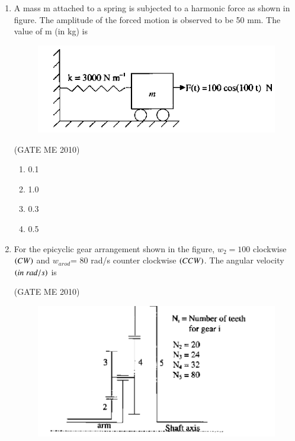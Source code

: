 \documentclass[journal,12pt,onecolumn]{IEEEtran}
\theoremstyle{remark}
\begin{document}
\begin{enumerate}
Direct shear stress $\brak{in\;MPa}$ in the most heavily loaded rivet is 


  \hfill{(GATE ME 2010)}

\begin{multicols}{4}
\begin{enumerate}
\item 4.4
\item 8.8
\item 17.6
\item 35.2
\end{enumerate}
\end{multicols}



\item A mass m attached to a spring is subjected to a harmonic force as shown in figure. The amplitude of the forced motion is observed to be 50 mm. The value of m (in kg) is
 \begin{figure}[H]
    \centering
    \includegraphics[width=0.7\columnwidth]{figs/fig2.png}
    \caption*{}
    \label{fig:Q33}
\end{figure}


\hfill{(GATE  ME 2010)}


\begin{multicols}{4}
\begin{enumerate}
\item 0.1
\item 1.0
\item 0.3
\item 0.5
\end{enumerate}
\end{multicols}

\item For the epicyclic gear arrangement shown in the figure, $w_{2}=100$ clockwise $\left(CW\right)$ and $w_{arod}$= 80 rad/s counter clockwise $\left(CCW\right)$. The angular velocity $\left(in\;rad/s\right)$ is


\hfill{(GATE  ME 2010)}

 \begin{figure}[H]
    \centering
    \includegraphics[width=0.7\columnwidth]{figs/fig3.png}
    \caption*{}
    \label{fig:Q34}
\end{figure}


\end{enumerate}
\end{document}
